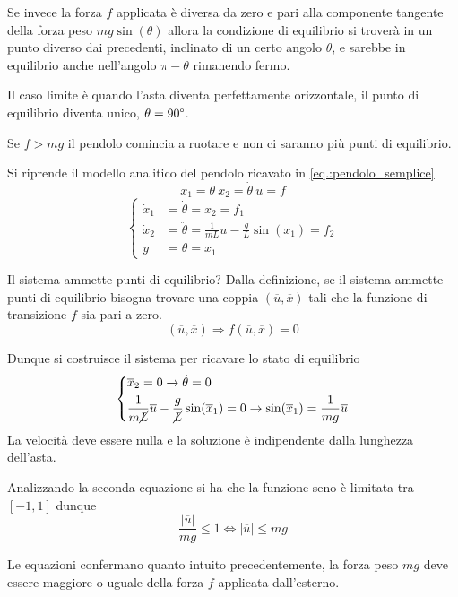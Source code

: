 Se invece la forza $f$ applicata è diversa da zero e pari alla componente
tangente della forza peso $mg\sin(\theta)$ allora la condizione di equilibrio
si troverà in un punto diverso dai precedenti, inclinato di un certo angolo
$\theta$, e sarebbe in equilibrio anche nell'angolo $\pi - \theta$ rimanendo
fermo.

Il caso limite è quando l'asta diventa perfettamente orizzontale, il punto di
equilibrio diventa unico, $\theta = 90\text{\textdegree}$.

Se $f > mg$ il pendolo comincia a ruotare e non ci saranno più punti di
equilibrio.

Si riprende il modello analitico del pendolo ricavato in
\ref{eq.:pendolo_semplice}
$$
x_1 = \theta\ x_2 = \dot\theta\ u=f
$$
\begin{equation*}
\left\{\begin{aligned}
\dot x_1 &= \dot\theta = x_2 = f_1\\
\dot x_2 &= \ddot\theta = \frac{1}{mL} u - \frac{g}{L}  \sin(x_1) =f_2 \\
y &= \theta = x_1
\end{aligned}\right.
\end{equation*}

Il sistema ammette punti di equilibrio? Dalla definizione, se il sistema
ammette punti di equilibrio bisogna trovare una coppia
$(\overline{u},\overline{x})$ tali che la funzione di transizione $f$ sia pari
a zero.
$$
(\overline{u},\overline{x}) \Rightarrow f(\overline{u},\overline{x}) = 0
$$

Dunque si costruisce il sistema per ricavare lo stato di equilibrio
$$\left\{\begin{aligned}
&\overline{x}_2 = 0 \rightarrow \dot\theta = 0\\
&\frac{1}{m\cancel{L}} \overline{u} - \frac{g}{\cancel{L}}
\sin(\overline{x}_1)=0 \rightarrow \sin(\overline{x}_1) =
\frac{1}{mg}\overline{u}
\end{aligned}\right.$$
La velocità deve essere nulla e la soluzione è indipendente dalla lunghezza
dell'asta.

Analizzando la seconda equazione si ha che la funzione seno è limitata tra
$[-1,1]$ dunque
$$
\frac{|\overline{u}|}{mg} \leq 1 \Longleftrightarrow
|\overline{u}| \leq mg
$$

Le equazioni confermano quanto intuito precedentemente, la forza peso $mg$ deve
essere maggiore o uguale della forza $f$ applicata dall'esterno.

